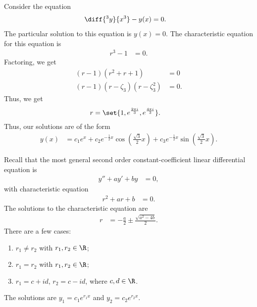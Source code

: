 \documentclass[10pt]{mypackage}
\begin{document}
\begin{example}
  Consider the equation
  \begin{align*}
    \diff{^3y}{x^3} - y(x) &= 0.
  \end{align*}
  The particular solution to this equation is $y(x) = 0$. The characteristic equation for this equation is
  \begin{align*}
    r^3 - 1 &= 0.
  \end{align*}
  Factoring, we get
  \begin{align*}
    \left(r-1\right)\left(r^2 + r + 1\right) &=0\\
    \left(r-1\right)\left(r-\zeta_3\right)\left(r-\zeta_3^2\right) &= 0.
  \end{align*}
  Thus, we get
  \begin{align*}
    r &= \set{1, e^{\frac{2\pi i}{3}}, e^{\frac{4\pi i}{3}}}.
  \end{align*}
  Thus, our solutions are of the form
  \begin{align*}
    y(x) &= c_1e^{x} + c_2e^{-\frac{1}{2}x}\cos\left(\frac{\sqrt{3}}{2}x\right) + c_3e^{-\frac{1}{2}x}\sin\left(\frac{\sqrt{3}}{2}x\right).
  \end{align*}
\end{example}
Recall that the most general second order constant-coefficient linear differential equation is 
\begin{align*}
  y'' + ay' + by &= 0,
\end{align*}
with characteristic equation 
\begin{align*}
  r^2 + ar + b &=0.
\end{align*}
The solutions to the characteristic equation are
\begin{align*}
  r &= -\frac{a}{2} \pm \frac{\sqrt{a^2 - 4b}}{2}.
\end{align*}
There are a few cases:
\begin{enumerate}[(1)]
  \item $r_1\neq r_2$ with $r_1,r_2\in \R$;
  \item $r_1 = r_2$ with $r_1,r_2\in \R$;
  \item $r_1 = c + id$, $r_2 = c - id$, where $c,d\in \R$.
\end{enumerate}
The solutions are $y_1 = c_1e^{r_1 x}$ and $y_2 = c_2e^{r_2 x}$.
\end{document}
